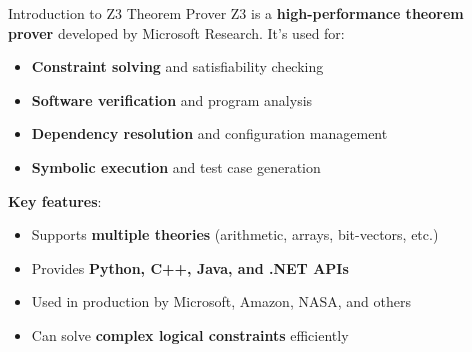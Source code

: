 \documentclass{beamer}
\begin{document}
\begin{frame}[t]{Introduction to Z3 Theorem Prover}
Z3 is a \textbf{high-performance theorem prover} developed by Microsoft Research. It's used for:
\begin{itemize}
\scriptsize
\item \textbf{Constraint solving} and satisfiability checking
\item \textbf{Software verification} and program analysis
\item \textbf{Dependency resolution} and configuration management
\item \textbf{Symbolic execution} and test case generation
\end{itemize}

\bigskip

\textbf{Key features}:
\begin{itemize}
\scriptsize
\item Supports \textbf{multiple theories} (arithmetic, arrays, bit-vectors, etc.)
\item Provides \textbf{Python, C++, Java, and .NET APIs}
\item Used in production by Microsoft, Amazon, NASA, and others
\item Can solve \textbf{complex logical constraints} efficiently
\end{itemize}
\end{frame}
\end{document}
